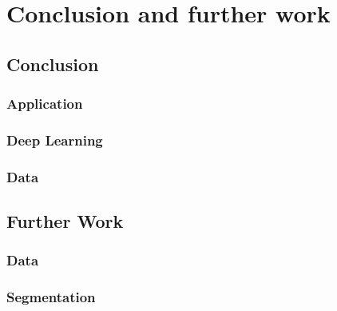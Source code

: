 \chapter{Conclusion and further work}

\section{Conclusion}

\subsection{Application}

\subsection{Deep Learning}

\subsection{Data}


\section{Further Work}

\subsection{Data}

\subsection{Segmentation}

